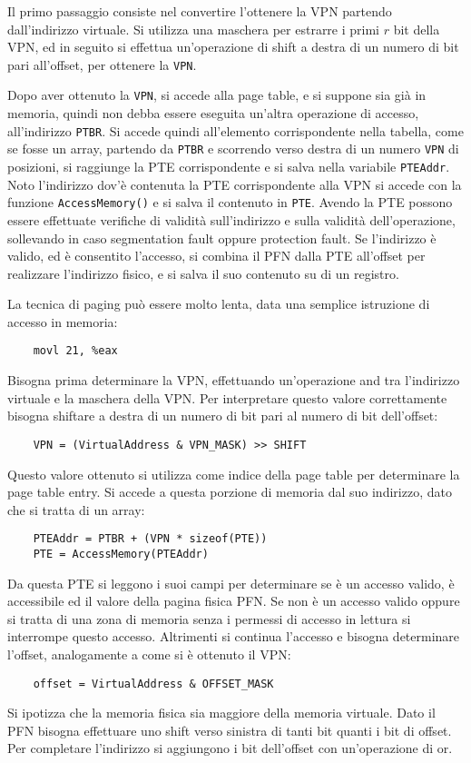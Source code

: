 \documentclass{article}
\numberwithin{equation}{subsection}
\begin{document}
Il primo passaggio consiste nel convertire l'ottenere la VPN partendo dall'indirizzo virtuale. Si utilizza una maschera per estrarre i primi $r$ bit della VPN, ed 
in seguito si effettua un'operazione di shift a destra di un numero di bit pari all'offset, per ottenere la \verb|VPN|. 

Dopo aver ottenuto la \verb|VPN|, si accede alla page table, e si suppone sia già in memoria, quindi non debba essere eseguita un'altra operazione di accesso, all'indirizzo 
\verb|PTBR|. Si accede quindi all'elemento corrispondente nella tabella, come se fosse un array, partendo da \verb|PTBR| e scorrendo verso destra di un numero \verb|VPN| 
di posizioni, si raggiunge la PTE corrispondente e si salva nella variabile \verb|PTEAddr|. Noto l'indirizzo dov'è contenuta la PTE corrispondente alla VPN si 
accede con la funzione \verb|AccessMemory()| e si salva il contenuto in \verb|PTE|. 
Avendo la PTE possono essere effettuate verifiche di validità sull'indirizzo e sulla validità dell'operazione, sollevando in caso segmentation fault oppure protection 
fault. 
Se l'indirizzo è valido, ed è consentito l'accesso, si combina il PFN dalla PTE all'offset per realizzare l'indirizzo fisico, e si salva il suo contenuto su 
di un registro. 


La tecnica di paging può essere molto lenta, data una semplice istruzione di accesso in memoria:
\begin{verbatim}
    movl 21, %eax
\end{verbatim}
Bisogna prima determinare la VPN, effettuando un'operazione and tra l'indirizzo virtuale e la maschera della VPN. Per interpretare questo valore correttamente 
bisogna shiftare a destra di un numero di bit pari al numero di bit dell'offset:
\begin{verbatim}
    VPN = (VirtualAddress & VPN_MASK) >> SHIFT
\end{verbatim}
Questo valore ottenuto si utilizza come indice della page table per determinare la page table entry. Si accede a questa porzione di memoria dal suo indirizzo, dato 
che si tratta di un array:
\begin{verbatim}
    PTEAddr = PTBR + (VPN * sizeof(PTE))
    PTE = AccessMemory(PTEAddr)
\end{verbatim}
Da questa PTE si leggono i suoi campi per determinare se è un accesso valido, è accessibile ed il valore della pagina fisica PFN. Se non è un accesso valido oppure 
si tratta di una zona di memoria senza i permessi di accesso in lettura si interrompe questo accesso. Altrimenti si continua l'accesso e bisogna determinare l'offset, 
analogamente a come si è ottenuto il VPN:
\begin{verbatim}
    offset = VirtualAddress & OFFSET_MASK
\end{verbatim} 
Si ipotizza che la memoria fisica sia maggiore della memoria virtuale. Dato il PFN bisogna effettuare uno shift verso sinistra di tanti bit quanti i bit di 
offset. Per completare l'indirizzo si aggiungono i bit dell'offset con un'operazione di or. 
\end{document}
